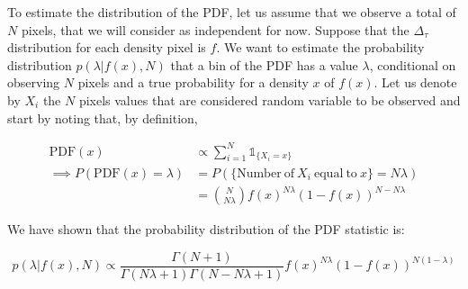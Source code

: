 To estimate the distribution of the PDF, let us assume that we observe a total of $N$ pixels, that we will consider as independent for now. Suppose that the $\Delta_\tau$ distribution for each density pixel is $f$. We want to estimate the probability distribution $p(\lambda |f(x),N )$ that a bin of the PDF has a value $\lambda$, conditional on observing $N$ pixels and a true probability for a density $x$ of $f(x)$. Let us denote by $X_i$ the $N$ pixels values that are considered random variable to be observed and start by noting that, by definition,

\begin{align}
    \mathrm{PDF} (x)& \propto \sum_{i=1}^N \mathds{1}_{\{X_i=x \}}\\
    \implies P(\mathrm{PDF}(x)=\lambda)&=P(\{ \mathrm{Number\ of\ } X_i \mathrm{\ equal\ to\ } x\}=N\lambda)\\
    &= {N\choose N\lambda}f(x)^{N\lambda}(1-f(x))^{N-N\lambda}
\end{align}





We have shown that the probability distribution of the PDF statistic is:

\begin{equation}\label{eq:PDF of PDF}
    p(\lambda |f(x),N )\propto \frac{\Gamma(N+1)}{\Gamma(N\lambda+1)\Gamma(N-N\lambda+1)} f(x)^{N\lambda}(1-f(x))^{N(1-\lambda)}
\end{equation}

